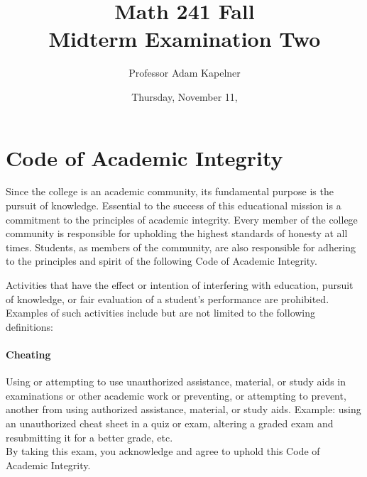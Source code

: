 \documentclass[12pt,landscape]{article}
\title{Math 241 Fall \the\year{} \\ Midterm Examination Two}
\author{Professor Adam Kapelner}
\date{Thursday, November 11, \the\year{}}
\begin{document}
\maketitle


\thispagestyle{empty}

\section*{Code of Academic Integrity}

\footnotesize
Since the college is an academic community, its fundamental purpose is the pursuit of knowledge. Essential to the success of this educational mission is a commitment to the principles of academic integrity. Every member of the college community is responsible for upholding the highest standards of honesty at all times. Students, as members of the community, are also responsible for adhering to the principles and spirit of the following Code of Academic Integrity.

Activities that have the effect or intention of interfering with education, pursuit of knowledge, or fair evaluation of a student's performance are prohibited. Examples of such activities include but are not limited to the following definitions:

\paragraph{Cheating} Using or attempting to use unauthorized assistance, material, or study aids in examinations or other academic work or preventing, or attempting to prevent, another from using authorized assistance, material, or study aids. Example: using an unauthorized cheat sheet in a quiz or exam, altering a graded exam and resubmitting it for a better grade, etc.
\\

\noindent By taking this exam, you acknowledge and agree to uphold this Code of Academic Integrity. \\


\normalsize
\end{document}
